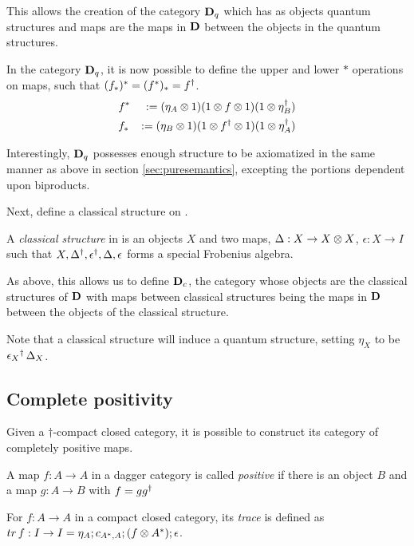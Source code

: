 This allows the creation of the category $\mathbf{D}_{q}$ which has as objects quantum structures and maps
are the maps in $\mathbf{D}$ between the objects in the quantum structures.

In the category $\mathbf{D}_{q}$, it is now possible to define the upper and lower $*$ operations on maps,
such that $(f_{*})^{*}= (f^{*})_{*} = {f}^{\dagger}$.
\begin{eqnarray*}
&f^{*} &:= (\eta_{A}\otimes1) (1 \otimes f\otimes1) (1\otimes{\eta}^{\dagger}_{B})\\
&f_{*} &:= (\eta_{B}\otimes1) (1 \otimes {f}^{\dagger}\otimes1) (1\otimes{\eta}^{\dagger}_{A})
\end{eqnarray*}

Interestingly, $\mathbf{D}_{q}$ possesses enough structure to be axiomatized in the same manner as above in
section \ref{sec:puresemantics}, excepting the portions dependent upon biproducts.

Next, define a classical structure on \cD.
\begin{definition}\label{def:classicalstructure}
  A \emph{classical structure} in \cD{} is an objects $X$ and two maps, $\Delta :X \to X\otimes X$,
  $\epsilon:X\to I$ such that $X,{\Delta}^{\dagger},{\epsilon}^{\dagger},\Delta,\epsilon$ forms a special
  Frobenius algebra.
\end{definition}

As above, this allows us to define $\mathbf{D}_{c}$, the category whose objects are the classical
structures of $\mathbf{D}$ with maps between classical structures being the maps in $\mathbf{D}$ between the
objects of the classical structure.

Note that a classical structure will induce a quantum structure, setting $\eta_{X}$ to be
${\epsilon_{X}}^{\dagger}\, \Delta_{X}$.

\subsection{Complete positivity}\label{sec:completepositivity}
Given a $\dagger$-compact closed category, it is possible to construct its category of completely
positive maps.

\begin{definition}\label{def:positivemap}
  A map $f:A\to A$ in a dagger category is called \emph{positive} if there is an object $B$ and a
  map $g:A\to B$ with $f = g {g}^{\dagger}$
\end{definition}

\begin{definition}[Trace]\label{def:tracecp}
  For $f:A\to A$ in a compact closed category, its \emph{trace} is defined as $tr\, f:I\to I =
  \eta_{A} ; c_{A^{*},A} ; (f\otimes A^{*}) ; \epsilon$.
\end{definition}

